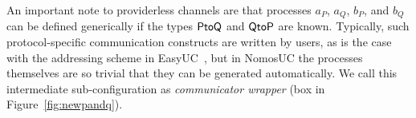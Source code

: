 An important note to providerless channels are that processes $a_P$, $a_Q$, $b_P$, and $b_Q$ can be defined
generically if the types $\mathsf{PtoQ}$ and $\mathsf{QtoP}$ are known.
Typically, such protocol-specific communication constructs are written by users, as is the case with the addressing scheme in EasyUC~\cite{easyuc},
but in NomosUC the processes themselves are so trivial that they can be generated automatically.
We call this intermediate sub-configuration as \emph{communicator wrapper} (box in Figure~\ref{fig:newpandq}).


